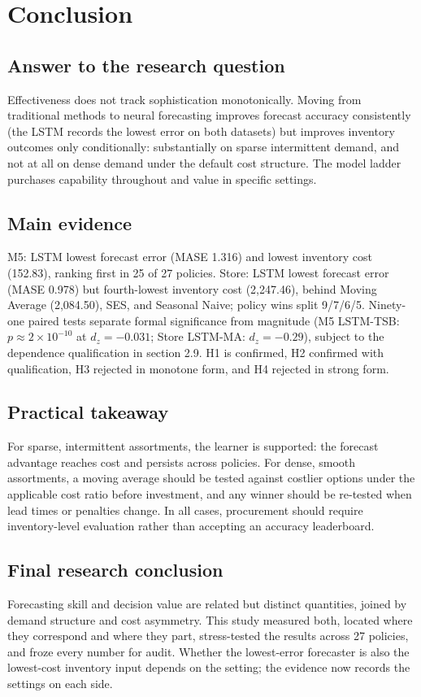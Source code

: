 \section{Conclusion}
\label{sec:conclusion}

\subsection{Answer to the research question}
\label{sec:answer}
Effectiveness does not track sophistication monotonically. Moving from
traditional methods to neural forecasting improves forecast accuracy
consistently (the LSTM records the lowest error on both datasets) but
improves inventory outcomes only conditionally: substantially on sparse
intermittent demand, and not at all on dense demand under the default cost
structure. The model ladder purchases capability throughout and value in
specific settings.

\subsection{Main evidence}
\label{sec:main-evidence}
M5: LSTM lowest forecast error (MASE 1.316) and lowest inventory cost
(152.83), ranking first in 25 of 27 policies. Store: LSTM lowest forecast
error (MASE 0.978) but fourth-lowest inventory cost (2,247.46), behind Moving
Average (2,084.50), SES, and Seasonal Naive; policy wins split 9/7/6/5.
Ninety-one paired tests separate formal significance from magnitude (M5
LSTM-TSB: $p\approx2\times 10^{-10}$ at $d_z=-0.031$; Store LSTM-MA:
$d_z=-0.29$), subject to the dependence qualification in
section 2.9. H1 is confirmed, H2 confirmed with qualification, H3
rejected in monotone form, and H4 rejected in strong form.

\subsection{Practical takeaway}
\label{sec:takeaway}
For sparse, intermittent assortments, the learner is supported: the forecast
advantage reaches cost and persists across policies. For dense, smooth
assortments, a moving average should be tested against costlier options
under the applicable cost ratio before investment, and any winner should be
re-tested when lead times or penalties change. In all cases, procurement
should require inventory-level evaluation rather than accepting an accuracy
leaderboard.

\subsection{Final research conclusion}
\label{sec:final-word}
Forecasting skill and decision value are related but distinct quantities,
joined by demand structure and cost asymmetry. This study measured both,
located where they correspond and where they part, stress-tested the results
across 27 policies, and froze every number for audit. Whether the
lowest-error forecaster is also the lowest-cost inventory input depends on
the setting; the evidence now records the settings on each side.
